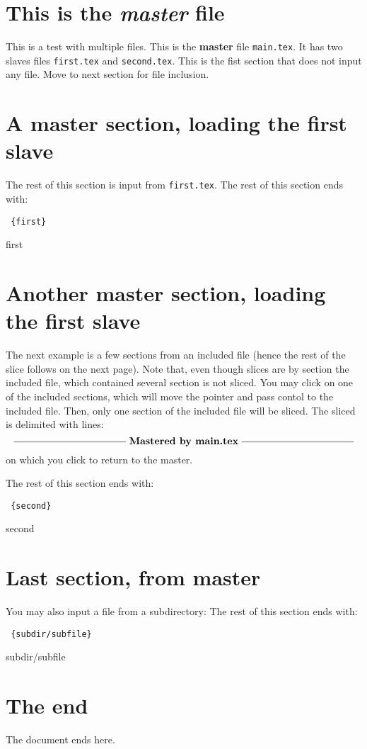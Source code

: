 \documentclass{article}
\begin{document}
\section {This is the {\em master} file}
   
This is a test with multiple files.  
This  is the {\bf master} file \verb"main.tex".   
It has two slaves files \verb"first.tex" and \verb"second.tex". 
This is the fist section that does not input any file.
Move to next section for file inclusion.

\section {A master section, loading the first slave} 

The rest of this section is input from \texttt{first.tex}.
The rest of this section ends with:
\begin{verbatim}
 {first}   
\end{verbatim}
 {first}   


 
\section {Another master section, loading the first slave}

The next example is a few sections from an included file (hence the rest of
the slice follows on the next page). Note that, even though slices are by
section the included file, which contained several section is not sliced.
You may click on one of the included sections, which will move the pointer
and pass contol to the included file. Then, only one section of the
included file will be sliced. The sliced is delimited with lines: 
$$
\centerline{\hrulefill\space \lower 0.5ex \hbox{\bf Mastered by main.tex}
\hrulefill}
$$
on which you click to return to the master. 

The rest of this section ends with:
\begin{verbatim}
 {second}
\end{verbatim}
 {second}

\section {Last section, from master}

You may also input a file from a subdirectory: 
The rest of this section ends with:
\begin{verbatim}
 {subdir/subfile}
\end{verbatim}
 {subdir/subfile}

\section{The end}
The document ends here. 
\end{document}
